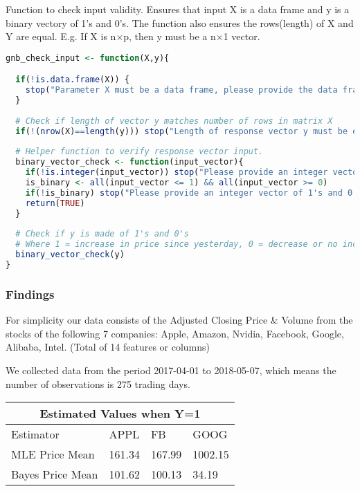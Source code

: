 \documentclass{article}
\begin{document}
Function to check input validity. Ensures that input X is a data frame and y is a binary vectory of 1's and 0's. The function also ensures the rows(length) of X and Y are equal. E.g. If X is n$\times$p, then y must be a n$\times$1 vector.
\begin{lstlisting}[language=R]
gnb_check_input <- function(X,y){

  if(!is.data.frame(X)) {
    stop("Parameter X must be a data frame, please provide the data frame whose columns are numeric variables and rows are observations")
  }
  
  # Check if length of vector y matches number of rows in matrix X
  if(!(nrow(X)==length(y))) stop("Length of response vector y must be equal to number of rows in X")
  
  # Helper function to verify response vector input.
  binary_vector_check <- function(input_vector){
    if(!is.integer(input_vector)) stop("Please provide an integer vector")    
    is_binary <- all(input_vector <= 1) && all(input_vector >= 0)    
    if(!is_binary) stop("Please provide an integer vector of 1's and 0's")
    return(TRUE)
  }
  
  # Check if y is made of 1's and 0's
  # Where 1 = increase in price since yesterday, 0 = decrease or no increase
  binary_vector_check(y)
}

\end{lstlisting}

\newpage
\subsubsection{Findings}

For simplicity our data consists of the Adjusted Closing Price \& Volume from the stocks of the following 7 companies: Apple, Amazon, Nvidia, Facebook, Google, Alibaba, Intel. (Total of 14 features or columns)\newline

We collected data from the period 2017-04-01 to 2018-05-07, which means the number of observations is 275 trading days.\newline

\begin{center}
\begin{tabular}{|p{3cm}||p{1cm}|p{1cm}|p{1cm}|  }
 \hline
 \multicolumn{4}{|c|}{Estimated Values when Y=1} \\
 \hline
 Estimator & APPL & FB & GOOG\\
 \hline
 MLE Price Mean & 161.34 & 167.99 & 1002.15 \\
 \hline
 Bayes Price Mean & 101.62  & 100.13 & 34.19 \\
 \hline
\end{tabular}
\end{center}
\end{document}
